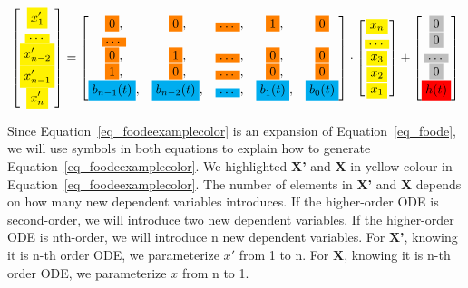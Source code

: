 \begin{equation} \label{eq_foodeexamplecolor}
	\begin{bmatrix}
		\highlight{yellow}{x_{1}'} \\
    \highlight{yellow}{\dots} \\
    \highlight{yellow}{x_{n-2}'} \\
    \highlight{yellow}{x_{n-1}'} \\
    \highlight{yellow}{x_{n}'}
	\end{bmatrix}
    = 
  \begin{bmatrix}
		\highlight{orange}{0}, & \highlight{orange}{0}, & \highlight{orange}{\dots}, & \highlight{orange}{1}, & \highlight{orange}{0} \\
    \highlight{orange}{\dots} \\
    \highlight{orange}{0}, & \highlight{orange}{1}, & \highlight{orange}{\dots}, & \highlight{orange}{0}, & \highlight{orange}{0} \\
    \highlight{orange}{1}, & \highlight{orange}{0}, & \highlight{orange}{\dots}, & \highlight{orange}{0}, & \highlight{orange}{0} \\
    \highlight{cyan}{b_{n-1}(t)}, & \highlight{cyan}{b_{n-2}(t)}, & \highlight{cyan}{\dots}, & \highlight{cyan}{b_{1}(t)}, & \highlight{cyan}{b_{0}(t)}
	\end{bmatrix}
    \cdot
  \begin{bmatrix}
    \highlight{yellow}{x_{n}} \\
    \highlight{yellow}{\dots} \\
    \highlight{yellow}{x_{3}} \\
		\highlight{yellow}{x_{2}} \\
    \highlight{yellow}{x_{1}}
	\end{bmatrix}
    + 
  \begin{bmatrix}
    \highlight{lightgray}{0} \\
    \highlight{lightgray}{0} \\
    \highlight{lightgray}{\dots} \\
    \highlight{lightgray}{0} \\
    \highlight{red}{h(t)}
	\end{bmatrix}
\end{equation}

Since Equation~\ref{eq_foodeexamplecolor} is an expansion of Equation~\ref{eq_foode}, we will use symbols in both equations to explain how to generate Equation~\ref{eq_foodeexamplecolor}. We highlighted \textbf{X'} and \textbf{X} in yellow colour in Equation~\ref{eq_foodeexamplecolor}. The number of elements in \textbf{X'} and \textbf{X} depends on how many new dependent variables introduces. If the higher-order ODE is second-order, we will introduce two new dependent variables. If the higher-order ODE is nth-order, we will introduce n new dependent variables. For \textbf{X'}, knowing it is n-th order ODE, we parameterize $x'$ from 1 to n. For \textbf{X}, knowing it is n-th order ODE, we parameterize $x$ from n to 1.

